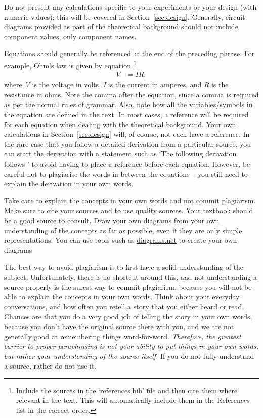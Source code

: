 \documentclass[a4paper, onecolumn, 12pt]{IEEEtran}
\begin{document}
Do not present any calculations specific to your experiments or your design (with numeric values); this will be covered in Section~\ref{sec:design}. Generally, circuit diagrams provided as part of the theoretical background should not include component values, only component names.

Equations should generally be referenced at the end of the preceding phrase. For example, Ohm's law is given by equation \cite{ohm}\footnote{Include the sources in the `references.bib' file and then cite them where relevant in the text. This will automatically include them in the References list in the correct order.}
\begin{align}
    V   &= IR, \label{eq:ohms_law}
\end{align}
where \textit{V} is the voltage in volts, \textit{I} is the current in amperes, and \textit{R} is the resistance in ohms. Note the comma after the equation, since a comma is required as per the normal rules of grammar. Also, note how all the variables/symbols in the equation are defined in the text. In most cases, a reference will be required for each equation when dealing with the theoretical background. Your own calculations in Section~\ref{sec:design} will, of course, not each have a reference. In the rare case that you follow a detailed derivation from a particular source, you can start the derivation with a statement such as `The following derivation follows \cite{ohm}' to avoid having to place a reference before each equation. However, be careful not to plagiarise the words in between the equations – you still need to explain the derivation in your own words.

Take care to explain the concepts in your own words and not commit plagiarism. Make sure to cite your sources and to use quality sources. Your textbook should be a good source to consult. Draw your own diagrams from your own understanding of the concepts as far as possible, even if they are only simple representations. You can use tools such as \href{https://www.diagrams.net/}{diagrams.net} to create your own diagrams

The best way to avoid plagiarism is to first have a solid understanding of the subject. Unfortunately, there is no shortcut around this, and not understanding a source properly is the surest way to commit plagiarism, because you will not be able to explain the concepts in your own words. Think about your everyday conversations, and how often you retell a story that you either heard or read. Chances are that you do a very good job of telling the story in your own words, because you don't have the original source there with you, and we are not generally good at remembering things word-for-word. \textit{Therefore, the greatest barrier to proper paraphrasing is not your ability to put things in your own words, but rather your understanding of the source itself.} If you do not fully understand a source, rather do not use it. 
\end{document}
